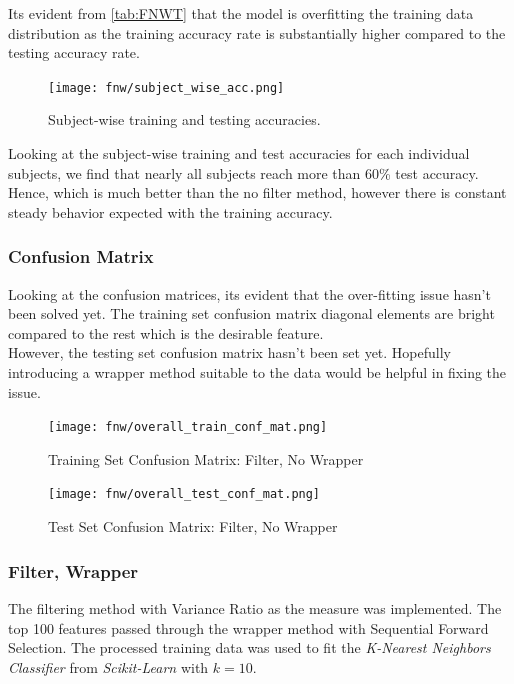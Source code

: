 \documentclass[12pt,twoside,a4paper]{article}
\begin{document}
Its evident from \ref{tab:FNWT} that the model is overfitting the training data distribution as the training accuracy rate is substantially higher compared to the testing accuracy rate.

\begin{figure}[H]
    \centering
    \texttt{[image: fnw/subject\_wise\_acc.png]}
    \caption{Subject-wise training and testing accuracies.}
    \label{fig: F3}
\end{figure}

Looking at the subject-wise training and test accuracies for each individual subjects, we find that nearly all subjects reach more than 60\% test accuracy. Hence, which is much better than the no filter method, however there is constant steady behavior expected with the training accuracy.

\subsubsection*{Confusion Matrix}

Looking at the confusion matrices, its evident that the over-fitting issue hasn't been solved yet. The training set confusion matrix diagonal elements are bright compared to the rest which is the desirable feature. \\
However, the testing set confusion matrix hasn't been set yet. Hopefully introducing a wrapper method suitable to the data would be helpful in fixing the issue.

\begin{figure}[H]
    \centering
    \texttt{[image: fnw/overall\_train\_conf\_mat.png]}
    \caption{Training Set Confusion Matrix: Filter, No Wrapper}
    \label{fig: F4}
\end{figure}

\begin{figure}[H]
    \centering
    \texttt{[image: fnw/overall\_test\_conf\_mat.png]}
    \caption{Test Set Confusion Matrix: Filter, No Wrapper}
    \label{fig: F5}
\end{figure}

\subsubsection{Filter, Wrapper}

The filtering method with Variance Ratio as the measure was implemented. The top 100 features passed through the wrapper method with Sequential Forward Selection. The processed training data was used to fit the \textit{K-Nearest Neighbors Classifier} from \textit{Scikit-Learn} with $k=10$.
\end{document}
